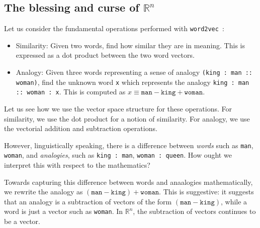 \documentclass[11pt]{book}
\newcommand{\wtov}{\texttt{word2vec }}
\begin{document}


\subsection{The blessing and curse of $\mathbb{R}^n$}

Let us consider the fundamental operations performed with \wtov:

\begin{itemize}
\item Similarity: Given two words, find how similar they are in meaning. This is
     expressed as a dot product between the two word vectors.
\item Analogy: Given three words representing a sense of analogy \texttt{(king : man :: woman)},
      find the unknown word \texttt{x} which represents the analogy
      \texttt{king : man :: woman : x}. This is computed as $x \equiv \texttt{man} - \texttt{king} + \texttt{woman}$.
\end{itemize}

Let us see how we use the vector space structure for these operations.
For similarity, we use the dot product for a notion of similarity. For 
analogy, we use the vectorial addition and subtraction operations.

However, linguistically speaking, there is a difference between \emph{words}
such as \texttt{man}, \texttt{woman}, and \emph{analogies}, such as
\texttt{king : man}, \texttt{woman : queen}. How ought we interpret this
with respect to the mathematics?

Towards capturing this difference between words and anaalogies mathematically,
we rewrite the analogy as $(\texttt{man} - \texttt{king}) + \texttt{woman}$.
This is suggestive: it suggests that an analogy is a subtraction of
vectors of the form $(\texttt{man}-\texttt{king})$, while a word is just a vector
such as \texttt{woman}.
In $\mathbb{R}^n$, the subtraction of vectors continues to  be a vector.
\end{document}
